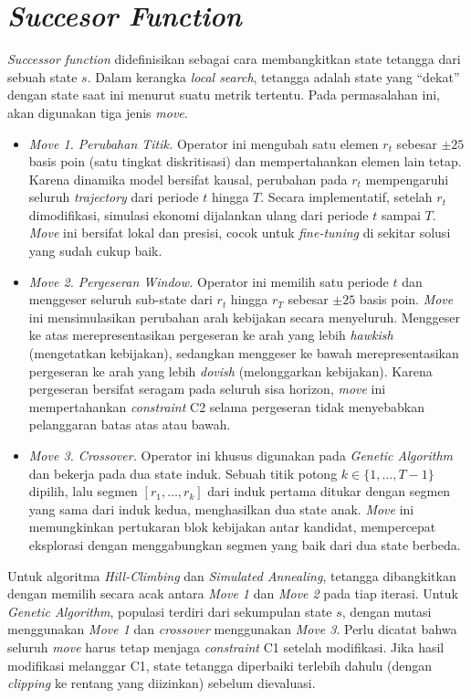 \section{\textit{Succesor Function}}

\textit{Successor function} didefinisikan sebagai cara membangkitkan state tetangga dari sebuah state $s$. Dalam kerangka \textit{local search}, tetangga adalah state yang ``dekat'' dengan state saat ini menurut suatu metrik tertentu. Pada permasalahan ini, akan digunakan tiga jenis \textit{move}.
\begin{itemize}
    \item \textit{Move 1. Perubahan Titik.} Operator ini mengubah satu elemen $r_t$ sebesar $\pm 25$ basis poin (satu tingkat diskritisasi) dan mempertahankan elemen lain tetap. Karena dinamika model bersifat kausal, perubahan pada $r_t$ mempengaruhi seluruh \textit{trajectory} dari periode $t$ hingga $T$. Secara implementatif, setelah $r_t$ dimodifikasi, simulasi ekonomi dijalankan ulang dari periode $t$ sampai $T$. \textit{Move} ini bersifat lokal dan presisi, cocok untuk \textit{fine-tuning} di sekitar solusi yang sudah cukup baik.
    \item \textit{Move 2. Pergeseran \textit{Window}.} Operator ini memilih satu periode $t$ dan menggeser seluruh sub-state dari $r_t$ hingga $r_T$ sebesar $\pm 25$ basis poin. \textit{Move} ini mensimulasikan perubahan arah kebijakan secara menyeluruh. Menggeser ke atas merepresentasikan pergeseran ke arah yang lebih \textit{hawkish} (mengetatkan kebijakan), sedangkan menggeser ke bawah merepresentasikan pergeseran ke arah yang lebih \textit{dovish} (melonggarkan kebijakan). Karena pergeseran bersifat seragam pada seluruh sisa horizon, \textit{move} ini mempertahankan \textit{constraint} C2 selama pergeseran tidak menyebabkan pelanggaran batas atas atau bawah.
    \item \textit{Move 3. Crossover.} Operator ini khusus digunakan pada \textit{Genetic Algorithm} dan bekerja pada dua state induk. Sebuah titik potong $k \in \{1, \dots, T-1\}$ dipilih, lalu segmen $[r_1, \dots, r_k]$ dari induk pertama ditukar dengan segmen yang sama dari induk kedua, menghasilkan dua state anak. \textit{Move} ini memungkinkan pertukaran blok kebijakan antar kandidat, mempercepat eksplorasi dengan menggabungkan segmen yang baik dari dua state berbeda.
\end{itemize}



Untuk algoritma \textit{Hill-Climbing} dan \textit{Simulated Annealing}, tetangga dibangkitkan dengan memilih secara acak antara \textit{Move 1} dan \textit{Move 2} pada tiap iterasi. Untuk \textit{Genetic Algorithm}, populasi terdiri dari sekumpulan state $s$, dengan mutasi menggunakan \textit{Move 1} dan \textit{crossover} menggunakan \textit{Move 3}. Perlu dicatat bahwa seluruh \textit{move} harus tetap menjaga \textit{constraint} C1 setelah modifikasi. Jika hasil modifikasi melanggar C1, state tetangga diperbaiki terlebih dahulu (dengan \textit{clipping} ke rentang yang diizinkan) sebelum dievaluasi.

